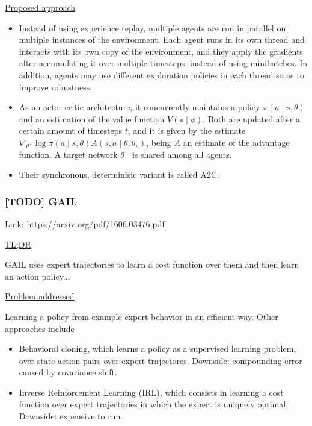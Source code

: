 \documentclass[12pt, english]{article}
\begin{document}
\underline{Proposed approach}

\begin{itemize}
  \item Instead of using experience replay, multiple agents are run in parallel on multiple instances of the environment. Each agent runs in its own thread and interacts with its own copy of the environment, and they apply the gradients after accumulating it over multiple timesteps, instead of using minibatches. In addition, agents may use different exploration policies in each thread so as to improve robustness.
  \item As an actor critic architecture, it concurrently maintains a policy $\pi(a \mid s, \theta)$ and an estimation of the value function $V(s \mid \phi)$. Both are updated after a certain amount of timesteps $t$, and it is given by the estimate $\nabla_{\theta^-} \log \pi (a \mid s, \theta) A(s,a \mid \theta, \theta_v)$, being $A$ an estimate of the advantage function. A target network $\theta^-$ is shared among all agents.
  \item Their synchronous, determinisic variant is called A2C.
\end{itemize}


\subsubsection{[TODO] GAIL}
\label{GAIL}

Link: \url{https://arxiv.org/pdf/1606.03476.pdf}

\underline{TL;DR}

GAIL \cite{ho_generative_2016} uses expert trajectories to learn a cost function over them and then learn an action policy...



\underline{Problem addressed}

Learning a policy from example expert behavior in an efficient way. Other approaches include

\begin{itemize}
  \item Behavioral cloning, which learns a policy as a supervised learning problem, over state-action pairs over expert trajectores. Downside: compounding error caused by covariance shift.
  \item Inverse Reinforcement Learning (IRL), which consists in learning a cost function over expert trajectories in which the expert is uniquely optimal. Downside: expensive to run.
\end{itemize}
\end{document}
